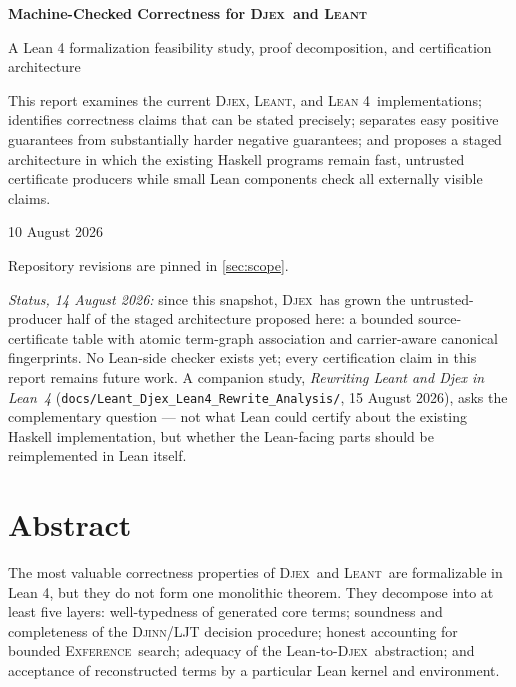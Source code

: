 \documentclass[11pt,letterpaper,openany]{report}
\theoremstyle{definition}
\theoremstyle{remark}
\newcommand{\Djex}{\textsc{Djex}}
\newcommand{\Djinn}{\textsc{Djinn}}
\newcommand{\Exference}{\textsc{Exference}}
\newcommand{\Leant}{\textsc{Leant}}
\newcommand{\Lean}{\textsc{Lean 4}}
\newcommand{\code}[1]{\texttt{#1}}
\begin{document}
\hypersetup{pageanchor=false}

\begin{titlepage}
\centering
\vspace*{1.0in}
{\Huge\bfseries\color{Ink} Machine-Checked Correctness for \Djex\ and \Leant\par}
\vspace{0.32in}
{\LARGE\color{Accent} A Lean 4 formalization feasibility study, proof decomposition, and certification architecture\par}
\vspace{0.72in}
\begin{minipage}{0.84\textwidth}
\centering
\large
This report examines the current \Djex, \Leant, and \Lean\ implementations; identifies correctness claims that can be stated precisely; separates easy positive guarantees from substantially harder negative guarantees; and proposes a staged architecture in which the existing Haskell programs remain fast, untrusted certificate producers while small Lean components check all externally visible claims.
\end{minipage}
\vfill
\vspace{0.08in}
{\large 10 August 2026\par}
\vspace{0.32in}
{\small Repository revisions are pinned in \cref{sec:scope}.}

\vspace{3mm}
{\small\emph{Status, 14 August 2026:} since this snapshot, \Djex\ has grown
the untrusted-producer half of the staged architecture proposed here: a
bounded source-certificate table with atomic term-graph association and
carrier-aware canonical fingerprints.  No Lean-side checker exists yet;
every certification claim in this report remains future work.  A companion
study, \emph{Rewriting Leant and Djex in Lean~4}
(\code{docs/Leant\_Djex\_Lean4\_Rewrite\_Analysis/}, 15 August 2026), asks
the complementary question --- not what Lean could certify about the
existing Haskell implementation, but whether the Lean-facing parts should
be reimplemented in Lean itself.}
\end{titlepage}

\hypersetup{pageanchor=true}
\chapter*{Abstract}
The most valuable correctness properties of \Djex\ and \Leant\ are formalizable in Lean 4, but they do not form one monolithic theorem. They decompose into at least five layers: well-typedness of generated core terms; soundness and completeness of the \Djinn/LJT decision procedure; honest accounting for bounded \Exference\ search; adequacy of the Lean-to-\Djex\ abstraction; and acceptance of reconstructed terms by a particular Lean kernel and environment.
\end{document}
